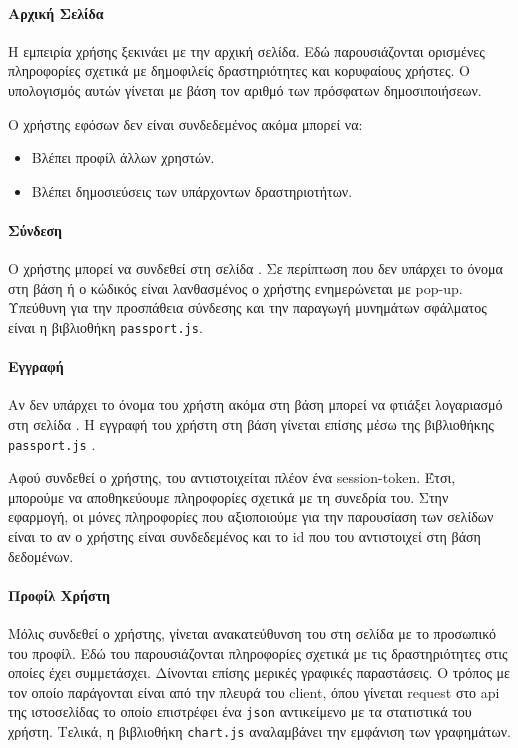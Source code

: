 \documentclass[acmtog, nonacm, language=english, language=greek]{acmart}
\newcommand{\en}[1]{\textlatin{#1}}
\newcommand{\src}[1]{\texttt{\en{#1}}}
\begin{document}
\paragraph{Αρχική Σελίδα}

Η εμπειρία χρήσης ξεκινάει με την αρχική σελίδα. 
Εδώ παρουσιάζονται ορισμένες πληροφορίες σχετικά με
δημοφιλείς δραστηριότητες και κορυφαίους χρήστες. 
Ο υπολογισμός αυτών γίνεται με βάση τον αριθμό των πρόσφατων δημοσιποιήσεων.

Ο χρήστης εφόσων δεν είναι συνδεδεμένος ακόμα μπορεί να: 

\begin{itemize}
    \item Βλέπει προφίλ άλλων χρηστών.
    \item Βλέπει δημοσιεύσεις των υπάρχοντων δραστηριοτήτων.
\end{itemize}

\paragraph{Σύνδεση}

Ο χρήστης μπορεί να συνδεθεί στη σελίδα \say{\en{Login}}. Σε περίπτωση που δεν
υπάρχει το όνομα στη βάση ή ο κώδικός είναι λανθασμένος ο χρήστης ενημερώνεται
με \en{pop-up}. Υπεύθυνη για την προσπάθεια σύνδεσης και την παραγωγή μυνημάτων
σφάλματος είναι η βιβλιοθήκη \src{passport.js}. 

\paragraph{Εγγραφή}

Αν δεν υπάρχει το όνομα του χρήστη ακόμα στη βάση μπορεί να φτιάξει λογαριασμό
στη σελίδα \say{\en{Register}}. Η εγγραφή του χρήστη στη βάση γίνεται επίσης
μέσω της βιβλιοθήκης \src{passport.js} \cite{Passport}.

Αφού συνδεθεί ο χρήστης, του αντιστοιχείται πλέον ένα \en{session-token}. Έτσι,
μπορούμε να αποθηκεύουμε πληροφορίες σχετικά με τη συνεδρία του. Στην εφαρμογή,
οι μόνες πληροφορίες που αξιοποιούμε για την παρουσίαση των σελίδων είναι το αν
ο χρήστης είναι συνδεδεμένος και το \en{id} που του αντιστοιχεί στη βάση
δεδομένων.

\paragraph{Προφίλ Χρήστη}

Μόλις συνδεθεί ο χρήστης, γίνεται ανακατεύθυνση του 
στη σελίδα με το προσωπικό του προφίλ. Εδώ του 
παρουσιάζονται πληροφορίες σχετικά με τις δραστηριότητες 
στις οποίες έχει συμμετάσχει. 
Δίνονται επίσης μερικές γραφικές παραστάσεις. Ο τρόπος με τον οποίο 
παράγονται είναι από την πλευρά του \en{client}, όπου γίνεται 
\en{request} στο \en{api} της ιστοσελίδας το οποίο επιστρέφει 
ένα \src{json} αντικείμενο με τα στατιστικά του χρήστη. 
Τελικά, η βιβλιοθήκη \src{chart.js} \cite{ChartJS}
αναλαμβάνει την εμφάνιση των γραφημάτων.
\end{document}
